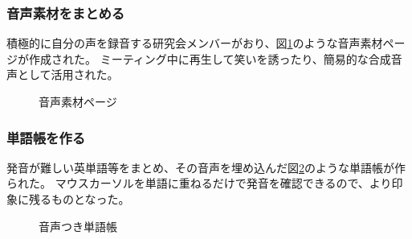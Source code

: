 \subsubsection{音声素材をまとめる}
積極的に自分の声を録音する研究会メンバーがおり、図\ref{hayakawa}のような音声素材ページが作成された。
ミーティング中に再生して笑いを誘ったり、簡易的な合成音声として活用された。

\begin{figure}[H]
\centering
{}
\caption{音声素材ページ}
\label{hayakawa}
\end{figure}

\subsubsection{単語帳を作る}
発音が難しい英単語等をまとめ、その音声を埋め込んだ図\ref{word}のような単語帳が作られた。
マウスカーソルを単語に重ねるだけで発音を確認できるので、より印象に残るものとなった。

\begin{figure}[H]
\centering
{}
\caption{音声つき単語帳}
\label{word}
\end{figure}

